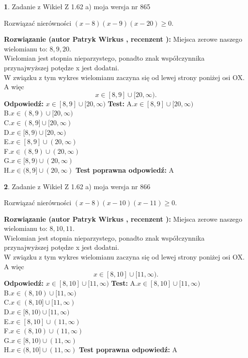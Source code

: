 \documentclass[12pt, a4paper]{article}
\theoremstyle{definition} %
\newtheorem{zad}{}
\newcommand{\zadStart}[1]{\begin{zad}#1\newline}
\newcommand{\zadStop}{\end{zad}}
\newcommand{\rozwStart}[2]{\noindent \textbf{Rozwiązanie (autor #1 , recenzent #2): }\newline}
\newcommand{\rozwStop}{\newline}
\newcommand{\odpStart}{\noindent \textbf{Odpowiedź:}\newline}
\newcommand{\odpStop}{\newline}
\newcommand{\testStart}{\noindent \textbf{Test:}\newline}
\newcommand{\testStop}{\newline}
\newcommand{\kluczStart}{\noindent \textbf{Test poprawna odpowiedź:}\newline}
\newcommand{\kluczStop}{\newline}
\begin{document}
\zadStart{Zadanie z Wikieł Z 1.62 a) moja wersja nr 865}

Rozwiązać nierówności $(x-8)(x-9)(x-20)\ge0$.
\zadStop
\rozwStart{Patryk Wirkus}{}
Miejsca zerowe naszego wielomianu to: $8, 9, 20$.\\
Wielomian jest stopnia nieparzystego, ponadto znak współczynnika przy\linebreak najwyższej potędze x jest dodatni.\\ W związku z tym wykres wielomianu zaczyna się od lewej strony poniżej osi OX. A więc $$x \in [8,9] \cup [20,\infty).$$
\rozwStop
\odpStart
$x \in [8,9] \cup [20,\infty)$
\odpStop
\testStart
A.$x \in [8,9] \cup [20,\infty)$\\
B.$x \in (8,9) \cup [20,\infty)$\\
C.$x \in (8,9] \cup [20,\infty)$\\
D.$x \in [8,9) \cup [20,\infty)$\\
E.$x \in [8,9] \cup (20,\infty)$\\
F.$x \in (8,9) \cup (20,\infty)$\\
G.$x \in [8,9) \cup (20,\infty)$\\
H.$x \in (8,9] \cup (20,\infty)$
\testStop
\kluczStart
A
\kluczStop



\zadStart{Zadanie z Wikieł Z 1.62 a) moja wersja nr 866}

Rozwiązać nierówności $(x-8)(x-10)(x-11)\ge0$.
\zadStop
\rozwStart{Patryk Wirkus}{}
Miejsca zerowe naszego wielomianu to: $8, 10, 11$.\\
Wielomian jest stopnia nieparzystego, ponadto znak współczynnika przy\linebreak najwyższej potędze x jest dodatni.\\ W związku z tym wykres wielomianu zaczyna się od lewej strony poniżej osi OX. A więc $$x \in [8,10] \cup [11,\infty).$$
\rozwStop
\odpStart
$x \in [8,10] \cup [11,\infty)$
\odpStop
\testStart
A.$x \in [8,10] \cup [11,\infty)$\\
B.$x \in (8,10) \cup [11,\infty)$\\
C.$x \in (8,10] \cup [11,\infty)$\\
D.$x \in [8,10) \cup [11,\infty)$\\
E.$x \in [8,10] \cup (11,\infty)$\\
F.$x \in (8,10) \cup (11,\infty)$\\
G.$x \in [8,10) \cup (11,\infty)$\\
H.$x \in (8,10] \cup (11,\infty)$
\testStop
\kluczStart
A
\kluczStop
\end{document}
